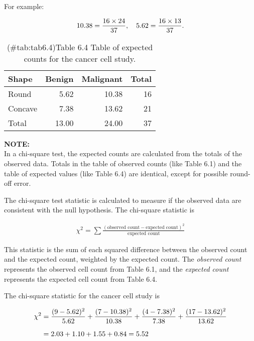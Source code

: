 \documentclass[
]{report}
\begin{document}
For example:

\begin{align}
10.38 = \frac{16 \times 24}{37}, \notag
\quad
5.62 = \frac{16 \times 13}{37}. \notag
\end{align}

\begin{table}

\caption{(\#tab:tab6.4)Table 6.4 Table of expected counts for the cancer cell study.}
\centering
\begin{tabular}[t]{lrrr}
\toprule
Shape & Benign & Malignant & Total\\
\midrule
Round & 5.62 & 10.38 & 16\\
Concave & 7.38 & 13.62 & 21\\
Total & 13.00 & 24.00 & 37\\
\bottomrule
\end{tabular}
\end{table}

\large

\textbf{NOTE:}\\
In a chi-square test, the expected counts are calculated from the totals of the observed data. Totals in the table of observed counts (like Table 6.1) and the table of expected values (like Table 6.4) are identical, except for possible round-off error.\\
\normalsize

The chi-square test statistic is calculated to measure if the observed data are consistent with the null
hypothesis. The chi-square statistic is

\begin{align}
\chi^2 = \sum \frac{(\text{observed count} - \text{expected count})^2}{\text{expected count}} 
\tag{6.3}
\end{align}

This statistic is the sum of each squared difference between the observed count and the expected count,
weighted by the expected count. The \emph{observed count} represents the observed cell count from Table 6.1, and
the \emph{expected count} represents the expected cell count from Table 6.4.

The chi-square statistic for the cancer cell study is

\begin{align}
\chi^2
&= \frac{(9 - 5.62)^2}{5.62} + \frac{(7 - 10.38)^2}{10.38} + \frac{(4 - 7.38)^2}{7.38} + \frac{(17 - 13.62)^2}{13.62} \\[6pt] \notag
&= 2.03 + 1.10 + 1.55 + 0.84 = 5.52 \notag
\end{align}
\end{document}
